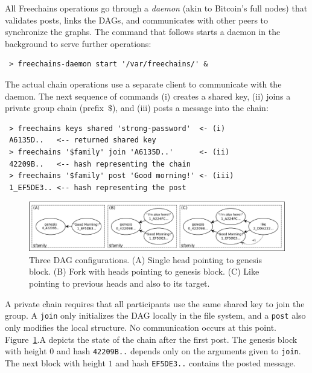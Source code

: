 \documentclass[12pt]{article}
\newcommand{\FC}       {Freechains\xspace}
\newcommand{\code}[1]  {\texttt{\footnotesize{#1}}}
\begin{document}
All \FC operations go through a \emph{daemon} (akin to Bitcoin's full nodes)
that validates posts, links the DAGs, and communicates with other peers to
synchronize the graphs.
The command that follows starts a daemon in the background to serve further
operations:

{\footnotesize
\begin{verbatim}
 > freechains-daemon start '/var/freechains/' &
\end{verbatim}
}

The actual chain operations use a separate client to communicate with the
daemon.
The next sequence of commands (i) creates a shared key, (ii) joins a private
group chain (prefix~$\$$), and (iii) posts a message into the chain:

{\footnotesize
\begin{verbatim}
 > freechains keys shared 'strong-password'  <- (i)
 A6135D..   <-- returned shared key
 > freechains '$family' join 'A6135D..'      <- (ii)
 42209B..   <-- hash representing the chain
 > freechains '$family' post 'Good morning!' <- (iii)
 1_EF5DE3.. <-- hash representing the post
\end{verbatim}
}

\begin{figure}
\centering
\includegraphics[width=\textwidth]{family.png}
\caption{
    Three DAG configurations.
    (A) Single head pointing to genesis block.
    (B) Fork with heads pointing to genesis block.
    (C) Like pointing to previous heads and also to its target.
}
\label{fig.family}
\end{figure}

A private chain requires that all participants use the same shared key to join
the group.
A \code{join} only initializes the DAG locally in the file system, and a
\code{post} also only modifies the local structure.
No communication occurs at this point.
Figure~\ref{fig.family}.A depicts the state of the chain after the first post.
The genesis block with height $0$ and hash \code{42209B..}
depends only on the arguments given to \code{join}.
The next block with height $1$ and hash \code{EF5DE3..} contains the posted
message.
\end{document}
